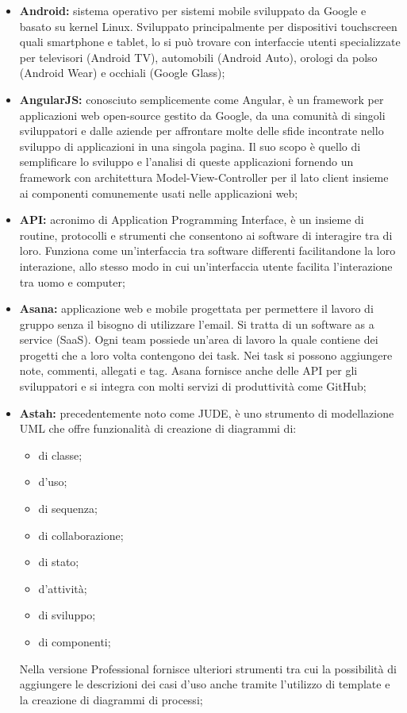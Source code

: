 	\begin{itemize}
		\item \textbf{Android:} sistema operativo per sistemi mobile sviluppato da Google e basato su kernel Linux. Sviluppato principalmente per dispositivi touchscreen quali smartphone e tablet, lo si può trovare con interfaccie utenti specializzate per televisori (Android TV), automobili (Android Auto), orologi da polso (Android Wear) e occhiali (Google Glass);
		\item \textbf{AngularJS:} conosciuto semplicemente come Angular, è un framework per applicazioni web open-source gestito da Google, da una comunità di singoli sviluppatori e dalle aziende per affrontare molte delle sfide incontrate nello sviluppo di applicazioni in una singola pagina. Il suo scopo è quello di semplificare lo sviluppo e l'analisi di queste applicazioni fornendo un framework con architettura Model-View-Controller per il lato client insieme ai componenti comunemente usati nelle applicazioni web;
		\item \textbf{API:} acronimo di Application Programming Interface, è un insieme di routine, protocolli e strumenti che consentono ai software di interagire tra di loro. Funziona come un'interfaccia tra software differenti facilitandone la loro interazione, allo stesso modo in cui un'interfaccia utente facilita l'interazione tra uomo e computer;
		\item \textbf{Asana:} applicazione web e mobile progettata per permettere il lavoro di gruppo senza il bisogno di utilizzare l'email. Si tratta di un software as a service (SaaS). Ogni team possiede un'area di lavoro la quale contiene dei progetti che a loro volta contengono dei task. Nei task si possono aggiungere note, commenti, allegati e tag. Asana fornisce anche delle API per gli sviluppatori e si integra con molti servizi di produttività come GitHub;
		\item \textbf{Astah:} precedentemente noto come JUDE, è uno strumento di modellazione UML che offre funzionalità di creazione di diagrammi di:
		\begin{itemize}
			\item di classe;
			\item d'uso;
			\item di sequenza;
			\item di collaborazione;
			\item di stato;
			\item d'attività;
			\item di sviluppo;
			\item di componenti;
		\end{itemize}
		Nella versione Professional fornisce ulteriori strumenti tra cui la possibilità di aggiungere le descrizioni dei casi d'uso anche tramite l'utilizzo di template e la creazione di diagrammi di processi;
	\end{itemize}
\pagebreak

